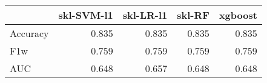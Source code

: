 \begin{tabular}{lrrrr}
\toprule
{} &  skl-SVM-l1 &  skl-LR-l1 &  skl-RF &  xgboost \\
\midrule
Accuracy &       0.835 &      0.835 &   0.835 &    0.835 \\
F1w      &       0.759 &      0.759 &   0.759 &    0.759 \\
AUC      &       0.648 &      0.657 &   0.648 &    0.648 \\
\bottomrule
\end{tabular}
